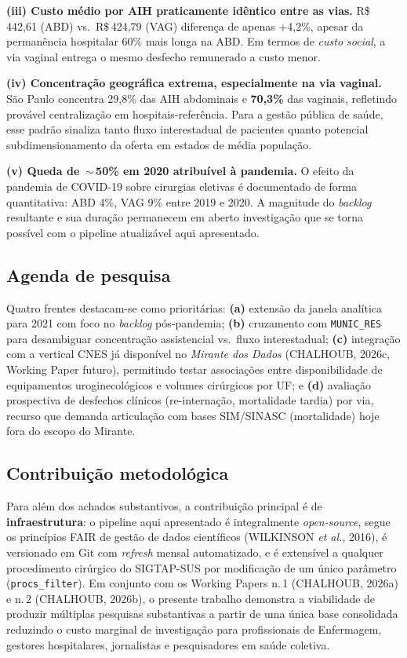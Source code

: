 \documentclass[12pt,a4paper,oneside]{article}
\newcommand{\rs}{R\$\,}
\begin{document}
\textbf{(iii) Custo médio por AIH praticamente idêntico entre as
vias.} \rs 442{,}61 (ABD) vs.\ \rs 424{,}79 (VAG) \textemdash{}
diferença de apenas +4{,}2\%, apesar da permanência hospitalar 60\%
mais longa na ABD. Em termos de \textit{custo social}, a via vaginal
entrega o mesmo desfecho remunerado a custo menor.

\textbf{(iv) Concentração geográfica extrema, especialmente na via
vaginal.} São Paulo concentra 29{,}8\% das AIH abdominais e
\textbf{70{,}3\%} das vaginais, refletindo provável centralização em
hospitais-referência. Para a gestão pública de saúde, esse padrão
sinaliza tanto fluxo interestadual de pacientes quanto potencial
subdimensionamento da oferta em estados de média população.

\textbf{(v) Queda de \,$\sim$\,50\% em 2020 atribuível à pandemia.} O
efeito da pandemia de COVID-19 sobre cirurgias eletivas é documentado
de forma quantitativa: ABD 4\%, VAG 9\%
entre 2019 e 2020. A magnitude do \textit{backlog} resultante e sua
duração permanecem em aberto \textemdash{} investigação que se torna
possível com o pipeline atualizável aqui apresentado.

\subsection{Agenda de pesquisa}

Quatro frentes destacam-se como prioritárias: \textbf{(a)} extensão da
janela analítica para 2021 com foco no \textit{backlog}
pós-pandemia; \textbf{(b)} cruzamento com \texttt{MUNIC\_RES} para
desambiguar concentração assistencial vs.\ fluxo interestadual;
\textbf{(c)} integração com a vertical CNES já disponível no
\textit{Mirante dos Dados} (CHALHOUB, 2026c, Working Paper futuro),
permitindo testar associações entre disponibilidade de equipamentos
uroginecológicos e volumes cirúrgicos por UF; e \textbf{(d)} avaliação
prospectiva de desfechos clínicos (re-internação, mortalidade tardia)
por via, recurso que demanda articulação com bases SIM/SINASC
(mortalidade) hoje fora do escopo do Mirante.

\subsection{Contribuição metodológica}

Para além dos achados substantivos, a contribuição principal é de
\textbf{infraestrutura}: o pipeline aqui apresentado é integralmente
\textit{open-source}, segue os princípios FAIR de gestão de dados
científicos (WILKINSON \textit{et al.}, 2016), é versionado em Git
com \textit{refresh} mensal automatizado, e é extensível a qualquer
procedimento cirúrgico do SIGTAP-SUS por modificação de um único
parâmetro (\texttt{procs\_filter}). Em conjunto com os Working
Papers n.\,1 (CHALHOUB, 2026a) e n.\,2 (CHALHOUB, 2026b), o presente
trabalho demonstra a viabilidade de produzir múltiplas pesquisas
substantivas a partir de uma única base consolidada \textemdash{}
reduzindo o custo marginal de investigação para profissionais de
Enfermagem, gestores hospitalares, jornalistas e pesquisadores em
saúde coletiva.
\end{document}
